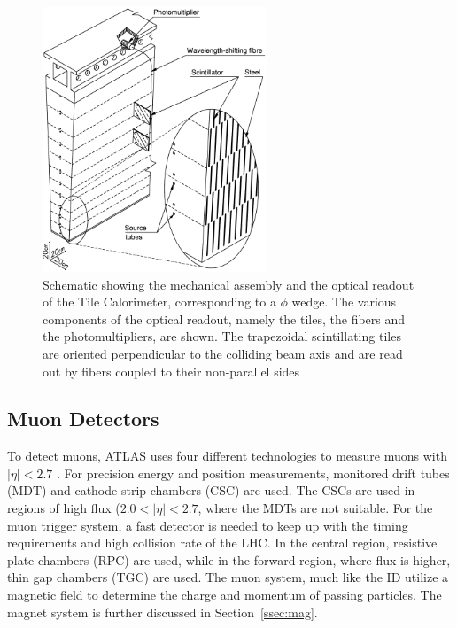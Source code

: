 \begin{figure}[h]
\begin{center}
\includegraphics*[width=0.60\textwidth] {figures/Schematic-showing-the-mechanical-assembly-and-the-optical-readout-of-the-Tile}%
\caption[Tile readout system]{Schematic showing the mechanical assembly and the optical readout of
the Tile Calorimeter, corresponding to a ${\phi}$ wedge. The various components of
the optical readout, namely the tiles, the fibers and the photomultipliers, are
shown. The trapezoidal scintillating tiles are oriented perpendicular to the
colliding beam axis and are read out by fibers coupled to their non-parallel
sides \cite{HenriquesCorreia:2004868}}
\label{fig:tile}
\end{center}
\end{figure}


\subsection{Muon Detectors}

To detect muons, ATLAS uses four different technologies to measure muons with $|\eta| < 2.7$ \cite{CERN-LHCC-97-022}. For precision energy and position measurements, monitored drift tubes (MDT) and cathode strip chambers (CSC) are used. The CSCs are used in regions of high flux ($2.0 < |\eta| < 2.7$, where the MDTs are not suitable.  For the muon trigger system, a fast detector is needed to keep up with the timing requirements and high collision rate of the LHC. In the central region, resistive plate chambers (RPC) are used, while in the forward region, where flux is higher, thin gap chambers (TGC) are used. The muon system, much like the ID utilize a magnetic field to determine the charge and momentum of passing particles. The magnet system is further discussed in Section~\ref{ssec:mag}.\newline

